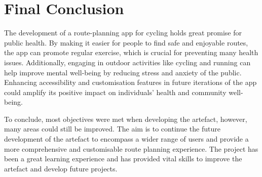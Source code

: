 \clearpage
\label{reflection-and-conclusion:final-conclusion}
\section{Final Conclusion}

The development of a route-planning app for cycling holds great promise for public health. By making it easier for people to find safe and enjoyable routes, the app can promote regular exercise, which is crucial for preventing many health issues. Additionally, engaging in outdoor activities like cycling and running can help improve mental well-being by reducing stress and anxiety of the public. Enhancing accessibility and customisation features in future iterations of the app could amplify its positive impact on individuals' health and community well-being. 

To conclude, most objectives were met when developing the artefact, however, many areas could still be improved. The aim is to continue the future development of the artefact to encompass a wider range of users and provide a more comprehensive and customisable route planning experience. The project has been a great learning experience and has provided vital skills to improve the artefact and develop future projects.

